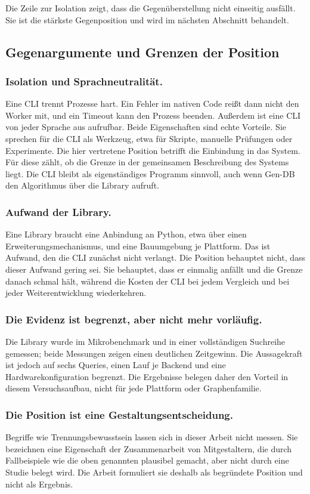\documentclass[a4paper,12pt, twoside]{report}
\theoremstyle{definition}
\begin{document}
Die Zeile zur Isolation zeigt, dass die Gegenüberstellung nicht einseitig ausfällt. Sie ist die stärkste Gegenposition und wird im nächsten Abschnitt behandelt.

\subsection{Gegenargumente und Grenzen der Position}
\label{sec:fremde_gegen}

\subsubsection{Isolation und Sprachneutralität.} Eine CLI trennt Prozesse hart. Ein Fehler im nativen Code reißt dann nicht den Worker mit, und ein Timeout kann den Prozess beenden. Außerdem ist eine CLI von jeder Sprache aus aufrufbar. Beide Eigenschaften sind echte Vorteile. Sie sprechen für die CLI als Werkzeug, etwa für Skripte, manuelle Prüfungen oder Experimente. Die hier vertretene Position betrifft die Einbindung in das System. Für diese zählt, ob die Grenze in der gemeinsamen Beschreibung des Systems liegt. Die CLI bleibt als eigenständiges Programm sinnvoll, auch wenn Gen-DB den Algorithmus über die Library aufruft.

\subsubsection{Aufwand der Library.} Eine Library braucht eine Anbindung an Python, etwa über einen Erweiterungsmechanismus, und eine Bauumgebung je Plattform. Das ist Aufwand, den die CLI zunächst nicht verlangt. Die Position behauptet nicht, dass dieser Aufwand gering sei. Sie behauptet, dass er einmalig anfällt und die Grenze danach schmal hält, während die Kosten der CLI bei jedem Vergleich und bei jeder Weiterentwicklung wiederkehren.

\subsubsection{Die Evidenz ist begrenzt, aber nicht mehr vorläufig.} Die Library wurde im Mikrobenchmark und in einer vollständigen Suchreihe gemessen; beide Messungen zeigen einen deutlichen Zeitgewinn. Die Aussagekraft ist jedoch auf sechs Queries, einen Lauf je Backend und eine Hardwarekonfiguration begrenzt. Die Ergebnisse belegen daher den Vorteil in diesem Versuchsaufbau, nicht für jede Plattform oder Graphenfamilie.

\subsubsection{Die Position ist eine Gestaltungsentscheidung.} Begriffe wie Trennungsbewusstsein lassen sich in dieser Arbeit nicht messen. Sie bezeichnen eine Eigenschaft der Zusammenarbeit von Mitgestaltern, die durch Fallbeispiele wie die oben genannten plausibel gemacht, aber nicht durch eine Studie belegt wird. Die Arbeit formuliert sie deshalb als begründete Position und nicht als Ergebnis.
\end{document}
